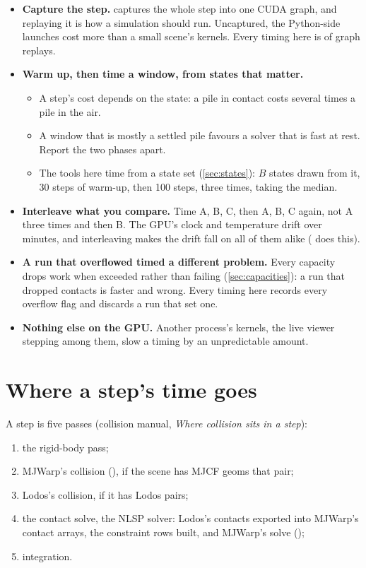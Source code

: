\begin{itemize}
\item \textbf{Capture the step.}  captures the whole step into one CUDA graph, and replaying it is how a simulation should run. Uncaptured, the Python-side launches cost more than a small scene's kernels. Every timing here is of graph replays.
\item \textbf{Warm up, then time a window, from states that matter.}
  \begin{itemize}
  \item A step's cost depends on the state: a pile in contact costs several times a pile in the air.
  \item A window that is mostly a settled pile favours a solver that is fast at rest. Report the two phases apart.
  \item The tools here time from a state set (\cref{sec:states}): $B$ states drawn from it, 30 steps of warm-up, then 100 steps, three times, taking the median.
  \end{itemize}
\item \textbf{Interleave what you compare.} Time A, B, C, then A, B, C again, not A three times and then B. The GPU's clock and temperature drift over minutes, and interleaving makes the drift fall on all of them alike ( does this).
\item \textbf{A run that overflowed timed a different problem.} Every capacity drops work when exceeded rather than failing (\cref{sec:capacities}): a run that dropped contacts is faster and wrong. Every timing here records every overflow flag and discards a run that set one.
\item \textbf{Nothing else on the GPU.} Another process's kernels, the live viewer stepping among them, slow a timing by an unpredictable amount.
\end{itemize}

\section{Where a step's time goes}\label{sec:where}

A step is five passes (collision manual, \emph{Where collision sits in a step}):

\begin{enumerate}
\item the rigid-body pass;
\item MJWarp's collision (), if the scene has MJCF geoms that pair;
\item Lodos's collision, if it has Lodos pairs;
\item the contact solve, the NLSP solver: Lodos's contacts exported into MJWarp's contact arrays, the constraint rows built, and MJWarp's solve ();
\item integration.
\end{enumerate}

